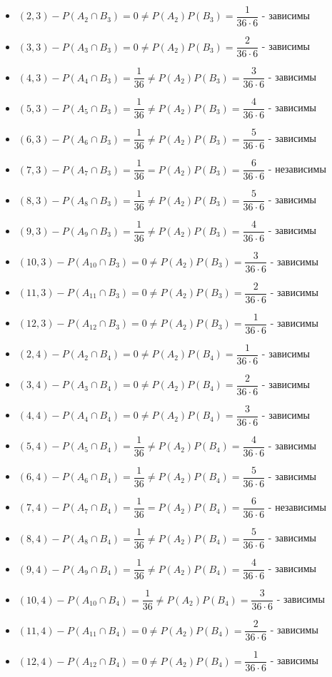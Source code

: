 \documentclass[a4paper,12pt]{article}
\begin{document}
\begin{itemize}
	\item \((2,3) -  P(A_2 \cap B_3) = 0 \neq P(A_2)P(B_3) = \dfrac{1}{36 \cdot 6} \) - зависимы
	\item \((3,3) -  P(A_3 \cap B_3) = 0 \neq P(A_2)P(B_3) = \dfrac{2}{36 \cdot 6} \) - зависимы
	\item \((4,3) -  P(A_4 \cap B_3) = \dfrac{1}{36} \neq P(A_2)P(B_3) = \dfrac{3}{36 \cdot 6} \) - зависимы
	\item \((5,3) -  P(A_5 \cap B_3) = \dfrac{1}{36} \neq P(A_2)P(B_3) = \dfrac{4}{36 \cdot 6} \) - зависимы
	\item \((6,3) -  P(A_6 \cap B_3) = \dfrac{1}{36} \neq P(A_2)P(B_3) = \dfrac{5}{36 \cdot 6} \) - зависимы
	\item \((7,3) -  P(A_7 \cap B_3) = \dfrac{1}{36} = P(A_2)P(B_3) = \dfrac{6}{36 \cdot 6} \) - независимы
	\item \((8,3) -  P(A_8 \cap B_3) = \dfrac{1}{36} \neq P(A_2)P(B_3) = \dfrac{5}{36 \cdot 6} \) - зависимы
	\item \((9,3) -  P(A_9 \cap B_3) = \dfrac{1}{36} \neq P(A_2)P(B_3) = \dfrac{4}{36 \cdot 6} \) - зависимы
	\item \((10,3) -  P(A_10 \cap B_3) = 0 \neq P(A_2)P(B_3) = \dfrac{3}{36 \cdot 6} \) - зависимы
	\item \((11,3) -  P(A_11 \cap B_3) = 0 \neq P(A_2)P(B_3) = \dfrac{2}{36 \cdot 6} \) - зависимы
	\item \((12,3) -  P(A_12 \cap B_3) = 0 \neq P(A_2)P(B_3) = \dfrac{1}{36 \cdot 6} \) - зависимы
\end{itemize}
\begin{itemize}
	\item \((2,4) -  P(A_2 \cap B_4) = 0 \neq P(A_2)P(B_4) = \dfrac{1}{36 \cdot 6} \) - зависимы
	\item \((3,4) -  P(A_3 \cap B_4) = 0 \neq P(A_2)P(B_4) = \dfrac{2}{36 \cdot 6} \) - зависимы
	\item \((4,4) -  P(A_4 \cap B_4) = 0 \neq P(A_2)P(B_4) = \dfrac{3}{36 \cdot 6} \) - зависимы
	\item \((5,4) -  P(A_5 \cap B_4) = \dfrac{1}{36} \neq P(A_2)P(B_4) = \dfrac{4}{36 \cdot 6} \) - зависимы
	\item \((6,4) -  P(A_6 \cap B_4) = \dfrac{1}{36} \neq P(A_2)P(B_4) = \dfrac{5}{36 \cdot 6} \) - зависимы
	\item \((7,4) -  P(A_7 \cap B_4) = \dfrac{1}{36} = P(A_2)P(B_4) = \dfrac{6}{36 \cdot 6} \) - независимы
	\item \((8,4) -  P(A_8 \cap B_4) = \dfrac{1}{36} \neq P(A_2)P(B_4) = \dfrac{5}{36 \cdot 6} \) - зависимы
	\item \((9,4) -  P(A_9 \cap B_4) = \dfrac{1}{36} \neq P(A_2)P(B_4) = \dfrac{4}{36 \cdot 6} \) - зависимы
	\item \((10,4) -  P(A_10 \cap B_4) = \dfrac{1}{36} \neq P(A_2)P(B_4) = \dfrac{3}{36 \cdot 6} \) - зависимы
	\item \((11,4) -  P(A_11 \cap B_4) = 0 \neq P(A_2)P(B_4) = \dfrac{2}{36 \cdot 6} \) - зависимы
	\item \((12,4) -  P(A_12 \cap B_4) = 0 \neq P(A_2)P(B_4) = \dfrac{1}{36 \cdot 6} \) - зависимы
\end{itemize}
\end{document}
